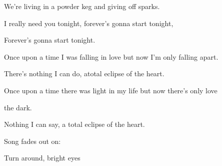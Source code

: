 We're living in a powder keg and giving off sparks.

I really need you tonight, forever's gonna start tonight,

Forever's gonna start tonight.

Once upon a time I was falling in love but now I'm only falling apart.

There's nothing I can do, atotal eclipse of the heart.

   

Once upon a time there was light in my life but now there's only love

the dark.

Nothing I can say, a total eclipse of the heart.    

Song fades out on:

Turn around, bright eyes  

